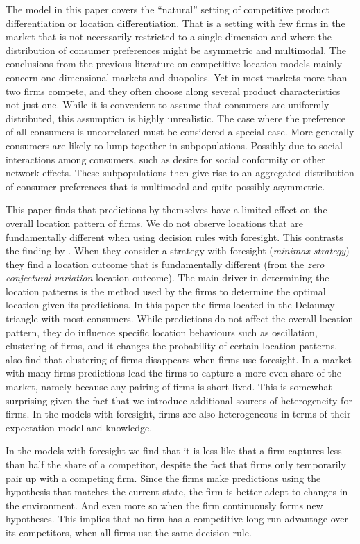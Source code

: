 \documentclass[preprint, 12pt]{elsarticle}
\begin{document}
The model in this paper covers the ``natural'' setting of competitive product differentiation or location differentiation. That is a setting with few firms in the market that is not necessarily restricted to a single dimension and where the distribution of consumer preferences might be asymmetric and multimodal. The conclusions from the previous literature on competitive location models mainly concern one dimensional markets and duopolies. Yet in most markets more than two firms compete, and they often choose along several product characteristics not just one. While it is convenient to assume that consumers are uniformly distributed, this assumption is highly unrealistic. The case where the preference of all consumers is uncorrelated must be considered a special case. More generally consumers are likely to lump together in subpopulations. Possibly due to social interactions among consumers, such as desire for social conformity or other network effects. These subpopulations then give rise to an aggregated distribution of consumer preferences that is multimodal and quite possibly asymmetric.

This paper finds that predictions by themselves have a limited effect on the overall location pattern of firms. We do not observe locations that are fundamentally different when using decision rules with foresight. This contrasts the finding by \citet{Eaton_Lipsey_1975}. When they consider a strategy with foresight (\emph{minimax strategy}) they find a location outcome that is fundamentally different (from the \emph{zero conjectural variation} location outcome). The main driver in determining the location patterns is the method used by the firms to determine the optimal location given its predictions. In this paper the firms located in the Delaunay triangle with most consumers. While predictions do not affect the overall location pattern, they do influence specific location behaviours such as oscillation, clustering of firms, and it changes the probability of certain location patterns. \citet{Eaton_Lipsey_1975} also find that clustering of firms disappears when firms use foresight. In a market with many firms predictions lead the firms to capture a more even share of the market, namely because any pairing of firms is short lived. This is somewhat surprising given the fact that we introduce additional sources of heterogeneity for firms. In the models with foresight, firms are also heterogeneous in terms of their expectation model and knowledge.

In the models with foresight we find that it is less like that a firm captures less than half the share of a competitor, despite the fact that firms only temporarily pair up with a competing firm. Since the firms make predictions using the hypothesis that matches the current state, the firm is better adept to changes in the environment. And even more so when the firm continuously forms new hypotheses. This implies that no firm has a competitive long-run advantage over its competitors, when all firms use the same decision rule.
\end{document}
